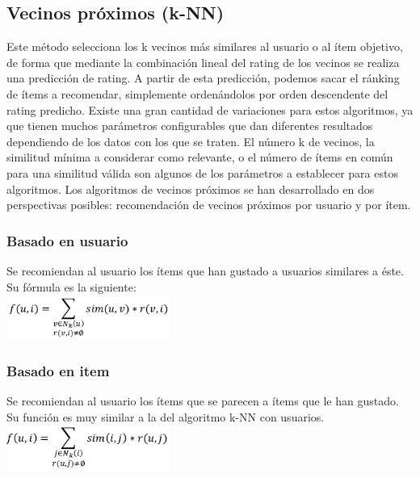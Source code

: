 \subsection{Vecinos próximos (k-NN)}
Este método selecciona los k vecinos más similares al usuario o al ítem objetivo, de forma que mediante la combinación lineal del rating de los vecinos se realiza una predicción de rating. A partir de esta predicción, podemos sacar el ránking de ítems a recomendar, simplemente ordenándolos por orden descendente del rating predicho. Existe una gran cantidad de variaciones para estos algoritmos, ya que tienen muchos parámetros configurables que dan diferentes resultados dependiendo de los datos con los que se traten. El número k de vecinos, la similitud mínima a considerar como relevante, o el número de ítems en común para una similitud válida son algunos de los parámetros a establecer para estos algoritmos. Los algoritmos de vecinos próximos se han desarrollado en dos perspectivas posibles: recomendación de vecinos próximos por usuario y por ítem. \cite{10}
\subsubsection{Basado en usuario}
Se recomiendan al usuario los ítems que han gustado a usuarios similares a éste. Su fórmula es la siguiente:  \cite{10}\\ 
\includegraphics[width=0.4\textwidth]{images/knn_user}

\subsubsection{Basado en item}
Se recomiendan al usuario los ítems que se parecen a ítems que le han gustado. Su función es muy similar a la del algoritmo k-NN con usuarios.
\cite{10}\\
 	 	
\includegraphics[width=0.4\textwidth]{images/knn_item}
 	 
